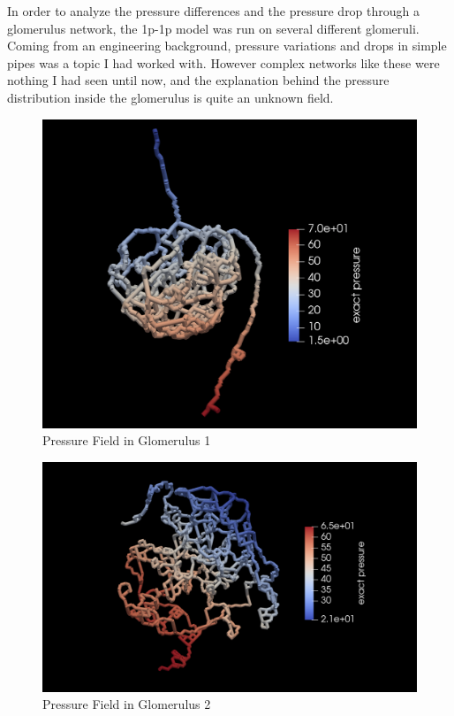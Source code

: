 In order to analyze the pressure differences and the pressure drop through a glomerulus network, the 1p-1p model was run on several different glomeruli. Coming from an engineering background, pressure variations and drops in simple pipes was a topic I had worked with. However complex networks like these were nothing I had seen until now, and the explanation behind the pressure distribution inside the glomerulus is quite an unknown field.\\
\begin{figure}[h]
\centering
\includegraphics[width=162mm]{glom_pressure}
\caption{Pressure Field in Glomerulus 1}
\label{fig:glom_pressure}
\end{figure}
\begin{figure}[h]
\centering
\includegraphics[width=162mm]{glom2_pressure}
\caption{Pressure Field in Glomerulus 2}
\label{fig:glom2_pressure}
\end{figure}
